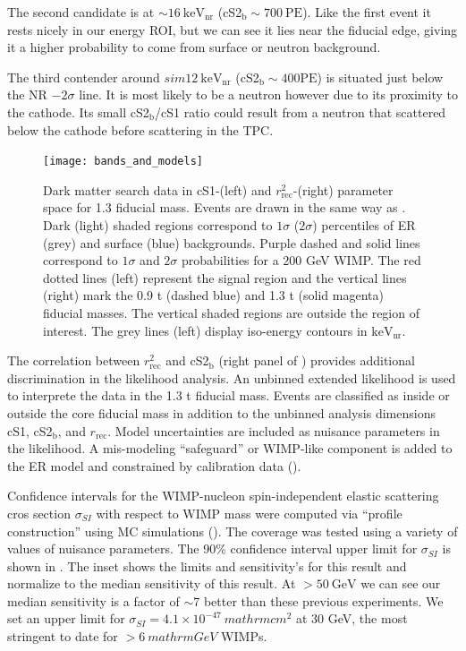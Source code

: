 The second candidate is at ${\sim} 16\ \mathrm{keV_{nr}}$ (cS2$_{\mathrm{b}} \sim 700\ \mathrm{PE}$).  Like the first event it
rests nicely in our energy ROI, but we can see it lies near the fiducial edge, giving it a higher probability to come from surface or
neutron background.

The third contender around ${sim} 12\ \mathrm{keV_{nr}}$ (cS2$_{\mathrm{b}} \sim 400 \mathrm{PE}$) is situated just below the NR
$-2 \sigma$ line.  It is most likely to be a neutron however due to its proximity to the cathode.  Its small cS2$_{\mathrm{b}}$/cS1
ratio could result from a neutron that scattered below the cathode before scattering in the TPC.

\begin{figure}
\centering
\texttt{[image: bands\_and\_models]}
\caption{Dark matter search data in cS1-\cstwob (left) and $r_{\mathrm{rec}}^2$-\cstwob (right) parameter space for 1.3 fiducial
mass.  Events are drawn in the same way as .  Dark (light) shaded regions correspond to
$1 \sigma$ ($2 \sigma$) percentiles of ER (grey) and surface (blue) backgrounds.  Purple dashed and solid lines
correspond to $1 \sigma$ and $2 \sigma$ probabilities for a 200 GeV WIMP.  The red dotted lines (left) represent the signal region
and the vertical lines (right) mark the 0.9 t (dashed blue) and 1.3 t (solid magenta) fiducial masses.  The vertical shaded
regions are outside the region of interest.  The grey lines (left) display iso-energy contours in $\mathrm{keV_{nr}}$.}
\label{fig:dark_matter_results_bands}
\end{figure}

The correlation between $r_{\mathrm{rec}}^2$ and cS2$_{\mathrm{b}}$ (right panel of ) provides
additional discrimination in the likelihood analysis.  An unbinned extended likelihood is used to interprete the data in the 1.3 t
fiducial mass.  Events are classified as inside or outside the core fiducial mass in addition to the unbinned analysis dimensions cS1,
cS2$_{\mathrm{b}}$, and $r_{\mathrm{rec}}$.  Model uncertainties are included as nuisance parameters in the likelihood.  A mis-modeling
``safeguard'' or WIMP-like component is added to the ER model and constrained by  calibration data ().

Confidence intervals for the WIMP-nucleon spin-independent elastic scattering cros section $\sigma_{SI}$ with respect to WIMP mass were
computed via ``profile construction'' using MC simulations
().  The coverage was tested using a variety of values of nuisance parameters.  The 90\% confidence interval upper
limit for $\sigma_{SI}$ is shown in .  The inset shows the limits and sensitivity's for this result
and  normalize to the median sensitivity of this result.  At $> 50\ \mathrm{GeV}$ we can see our median
sensitivity is a factor of ${\sim}7$ better than these previous experiments.  We set an upper limit for
$\sigma_{SI} = 4.1 \times 10^{-47}\ mathrm{cm^2}$ at 30 GeV, the most stringent to date for $> 6\ mathrm{GeV}$ WIMPs.

